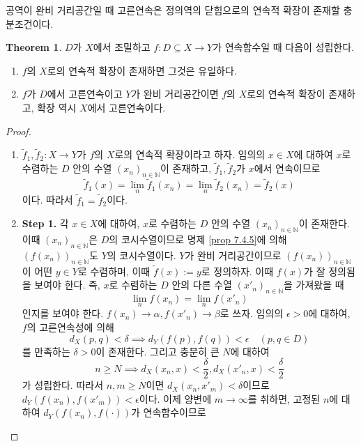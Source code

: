 \documentclass[11pt]{book}
\numberwithin{equation}{chapter}
\def\NN{\mathbb{N}}
\def\eps{\epsilon}
\theoremstyle{definition}
\newtheorem{thm}{Theorem}[section]
\newenvironment{enum}
	{\begin{enumerate}[label=(\alph*), leftmargin=2\parindent]}
	{\end{enumerate}}
\begin{document}
공역이 완비 거리공간일 때 고른연속은 정의역의 닫힘으로의 연속적 확장이 존재할 충분조건이다.

\begin{thm} \label{7.4.7}
    \(D\)가 \(X\)에서 조밀하고 \(f : D \subseteq X \to Y\)가 연속함수일 때 다음이 성립한다.
    \begin{enum}
        \item \(f\)의 \(X\)로의 연속적 확장이 존재하면 그것은 유일하다. 
        \item \(f\)가 \(D\)에서 고른연속이고 \(Y\)가 완비 거리공간이면 \(f\)의 \(X\)로의 연속적 확장이 존재하고, 확장 역시 \(X\)에서 고른연속이다.
    \end{enum}
\end{thm}
\begin{proof}
    \quad

    \begin{enum}
        \item \(\tilde{f}_1, \tilde{f}_2 : X \to Y\)가 \(f\)의 \(X\)로의 연속적 확장이라고 하자. 임의의 \(x \in X\)에 대하여 \(x\)로 수렴하는 \(D\) 안의 수열 \((x_n)_{n \in \NN}\)이 존재하고, \(\tilde{f}_1, \tilde{f}_2\)가 \(x\)에서 연속이므로
        \[
        \tilde{f}_1(x) = \lim_{n } \tilde{f}_1(x_n) = \lim_{n } \tilde{f}_2(x_n) = \tilde{f}_2(x)
        \]
        이다. 따라서 \(\tilde{f}_1 = \tilde{f}_2\)이다.
        \item \textbf{Step 1.} 각 \(x \in X\)에 대하여, \(x\)로 수렴하는 \(D\) 안의 수열 \((x_n)_{n \in \NN}\)이 존재한다. 이때 \((x_n)_{n \in \NN}\)은 \(D\)의 코시수열이므로 명제 \ref{prop 7.4.5}에 의해 \((f(x_n))_{n \in \NN}\)도 \(Y\)의 코시수열이다. \(Y\)가 완비 거리공간이므로 \((f(x_n))_{n \in \NN}\)이 어떤 \(y \in Y\)로 수렴하며, 이때 \(\tilde{f}(x) := y\)로 정의하자. 이때 \(f(x)\)가 잘 정의됨을 보여야 한다. 즉, \(x\)로 수렴하는 \(D\) 안의 다른 수열 \((x'_n)_{n \in \NN}\)을 가져왔을 때
        \[
        \lim_{n } f(x_n) = \lim_{n } f(x'_n)   
        \]
        인지를 보여야 한다. \(f(x_n) \to \alpha, f(x'_n) \to \beta\)로 쓰자. 임의의 \(\eps > 0\)에 대하여, \(f\)의 고른연속성에 의해
        \begin{equation} \label{eq7.5}
            d_X(p, q) < \delta \implies d_Y(f(p), f(q)) < \eps \quad (p, q \in D)   
        \end{equation}
        를 만족하는 \(\delta > 0\)이 존재한다. 그리고 충분히 큰 \(N\)에 대하여
        \[
        n \ge N \implies d_X(x_n, x) < \frac{\delta}{2}, d_X(x'_n, x) < \frac{\delta}{2}    
        \]
        가 성립한다. 따라서 \(n, m \ge N\)이면 \(d_X(x_n, x'_m) < \delta\)이므로 \(d_Y(f(x_n), f(x'_m)) < \eps\)이다. 이제 양변에 \(m \to \infty\)를 취하면, 고정된 \(n\)에 대하여 \(d_Y(f(x_n), f(\cdot))\)가 연속함수이므로

\end{enum}
\end{proof}
\end{document}
